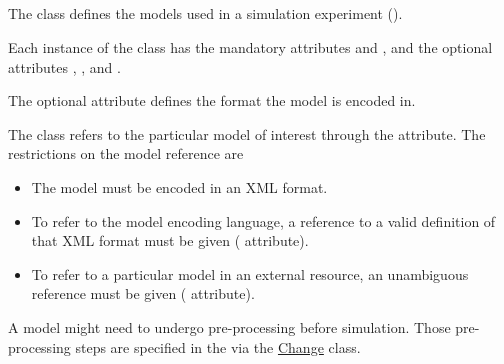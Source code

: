 \subsection{}
\label{class:model}
The  class defines the models used in a simulation experiment ().


Each instance of the  class has the mandatory attributes \hyperref[sec:id]{} and \hyperref[sec:model_source]{}, and the optional attributes \hyperref[sec:name]{}, \hyperref[sec:language]{}, and \hyperref[sec:changesModel]{}.

The optional attribute \hyperref[sec:language]{} defines the format the model is encoded in.

The  class refers to the particular model of interest through the \hyperref[sec:model_source]{} attribute. The restrictions on the model reference are
\begin{itemize}
 \item{The model must be encoded in an XML format.}
 \item{To refer to the model encoding language, a reference to a valid definition of that XML format must be given (\hyperref[sec:language]{} attribute).}
 \item{To refer to a particular model in an external resource, an unambiguous reference must be given (\hyperref[sec:model_source]{} attribute).}
\end{itemize}

A model might need to undergo pre-processing before simulation. Those pre-processing steps are specified in the \hyperref[sec:changesModel]{} via the \hyperref[class:change]{Change} class.



